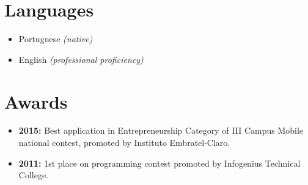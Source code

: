 \documentclass[11pt,a4paper,sans]{moderncv}        %
\begin{document}
\section{Languages}

\vspace{6pt}

\begin{itemize}

\item{Portuguese \textit{(native)}}
\item{English \textit{(professional proficiency)}}

\end{itemize}

\section{Awards}

\vspace{6pt}
 
\begin{itemize}

\item{\textbf{2015:} Best application in Entrepreneurship Category of III Campus Mobile national contest, promoted by Instituto Embratel-Claro.}

\item{\textbf{2011:} 1st place on programming contest promoted by Infogenius Technical College.}

\end{itemize}

\nocite{*}



\end{document}
